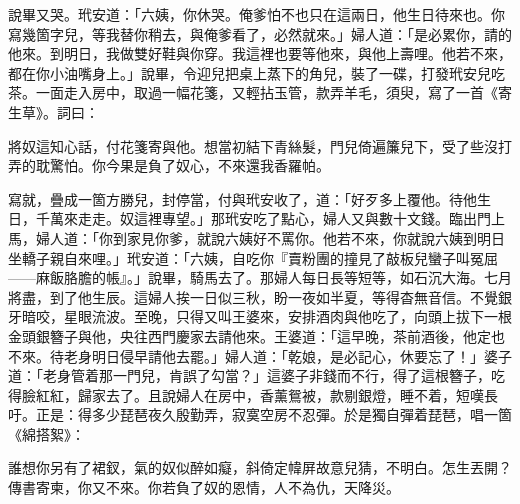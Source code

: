 說畢又哭。玳安道：「六姨，你休哭。俺爹怕不也只在這兩日，他生日待來也。你寫幾箇字兒，等我替你稍去，與俺爹看了，必然就來。」婦人道：「是必累你，請的他來。到明日，我做雙好鞋與你穿。我這裡也要等他來，與他上壽哩。他若不來，都在你小油嘴身上。」說畢，令迎兒把桌上蒸下的角兒，裝了一碟，打發玳安兒吃茶。一面走入房中，取過一幅花箋，又輕拈玉管，款弄羊毛，須臾，寫了一首《寄生草》。詞曰：

\begin{myquote} 
將奴這知心話，付花箋寄與他。想當初結下青絲髮，門兒倚遍簾兒下，受了些沒打弄的耽驚怕。你今果是負了奴心，不來還我香羅帕。
\end{myquote} 

寫就，疊成一箇方勝兒，封停當，付與玳安收了，道：「好歹多上覆他。待他生日，千萬來走走。奴這裡專望。」那玳安吃了點心，婦人又與數十文錢。臨出門上馬，婦人道：「你到家見你爹，就說六姨好不罵你。{}他若不來，你就說六姨到明日坐轎子親自來哩。」玳安道：「六姨，自吃你『賣粉團的撞見了敲板兒蠻子叫冤屈——麻飯胳膽的帳』。」{}說畢，騎馬去了。那婦人每日長等短等，如石沉大海。七月將盡，到了他生辰。這婦人挨一日似三秋，盼一夜如半夏，等得杳無音信。不覺銀牙暗咬，星眼流波。至晚，只得又叫王婆來，安排酒肉與他吃了，向頭上拔下一根金頭銀簪子與他，央往西門慶家去請他來。王婆道：「這早晚，茶前酒後，他定也不來。待老身明日侵早請他去罷。」婦人道：「乾娘，是必記心，休要忘了！」婆子道：「老身管着那一門兒，{}肯誤了勾當？」這婆子非錢而不行，得了這根簪子，吃得臉紅紅，歸家去了。且說婦人在房中，香薰鴛被，款剔銀燈，睡不着，短嘆長吁。正是：得多少琵琶夜久殷勤弄，寂寞空房不忍彈。於是獨自彈着琵琶，唱一箇《綿搭絮》：

\begin{myquote} 
誰想你另有了裙釵，氣的奴似醉如癡，斜倚定幃屏故意兒猜，不明白。怎生丟開？傳書寄柬，你又不來。你若負了奴的恩情，人不為仇，天降災。
\end{myquote} 

